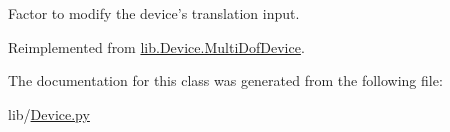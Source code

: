 \-Factor to modify the device's translation input. 



\-Reimplemented from \hyperlink{classlib_1_1Device_1_1MultiDofDevice_a92b1c30e0edb14afd629c053d6719594}{lib.\-Device.\-Multi\-Dof\-Device}.



\-The documentation for this class was generated from the following file\-:\begin{DoxyCompactItemize}
\item 
lib/\hyperlink{Device_8py}{\-Device.\-py}\end{DoxyCompactItemize}
